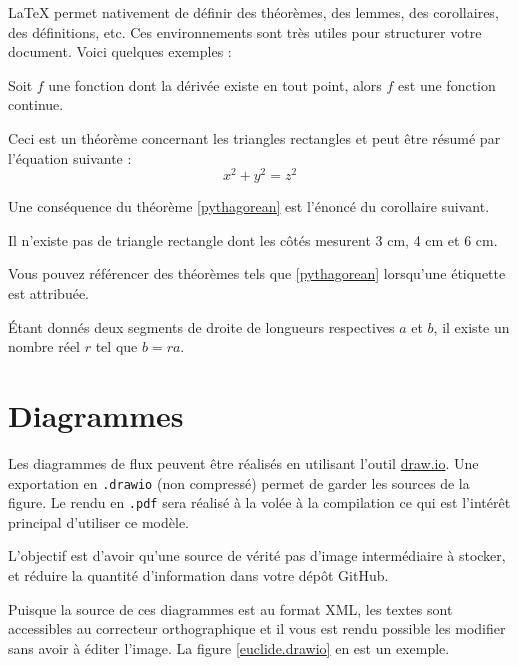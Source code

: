 \LaTeX{} permet nativement de définir des théorèmes, des lemmes, des corollaires, des définitions, etc. Ces environnements sont très utiles pour structurer votre document. Voici quelques exemples :

\begin{theorem}
    Soit \(f\) une fonction dont la dérivée existe en tout point, alors \(f\) est
    une fonction continue.
\end{theorem}

\begin{theorem}
    \label{pythagorean}
    Ceci est un théorème concernant les triangles rectangles et peut être résumé par l'équation suivante :
    \[ x^2 + y^2 = z^2 \]
\end{theorem}

Une conséquence du théorème \ref{pythagorean} est l'énoncé du corollaire suivant.

\begin{corollary}
    Il n'existe pas de triangle rectangle dont les côtés mesurent 3 cm, 4 cm et 6 cm.
\end{corollary}

Vous pouvez référencer des théorèmes tels que \ref{pythagorean} lorsqu'une étiquette est attribuée.

\begin{lemma}
    Étant donnés deux segments de droite de longueurs respectives \(a\) et \(b\), il existe un
    nombre réel \(r\) tel que \(b = ra\).
\end{lemma}


\section{Diagrammes}

Les diagrammes de flux peuvent être réalisés en utilisant l'outil \href{https://app.diagrams.net/}{draw.io}. Une exportation en \texttt{.drawio} (non compressé) permet de garder les sources de la figure. Le rendu en \texttt{.pdf} sera réalisé à la volée à la compilation ce qui est l'intérêt principal d'utiliser ce modèle.

L'objectif est d'avoir qu'une source de vérité \cad pas d'image intermédiaire à stocker, et réduire la quantité d'information dans votre dépôt GitHub.

Puisque la source de ces diagrammes est au format XML, les textes sont accessibles au correcteur orthographique et il vous est rendu possible les modifier sans avoir à éditer l'image. La figure \ref{euclide.drawio} en est un exemple.

